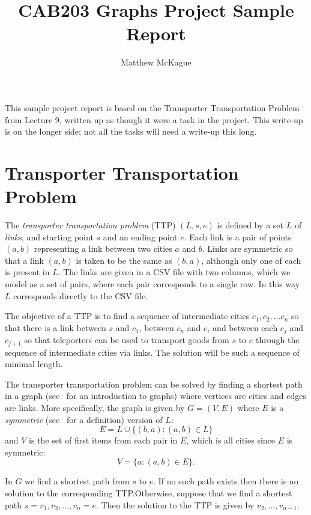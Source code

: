 \documentclass[a4paper]{article}
\author{Matthew McKague}
\title{CAB203 Graphs Project Sample Report}
\date{}
\begin{document}
\maketitle

This sample project report is based on the Transporter Transportation Problem from Lecture 9, written up as though it were a task in the project.  This write-up is on the longer side; not all the tasks will need a write-up this long.

\section{Transporter Transportation Problem}

The \emph{transporter transportation problem} (TTP) $(L, s, e)$ is defined by a set $L$ of \emph{links}, and starting point $s$ and an ending point $e$.  Each link is a pair of points $(a,b)$ representing a link between two cities $a$ and $b$.  Links are symmetric so that a link $(a,b)$ is taken to be the same as $(b, a)$, although only one of each is present in $L$.  The links are given in a CSV file with two columns, which we model as a set of pairs, where each pair corresponds to a single row.  In this way $L$ corresponds directly to the CSV file.

The objective of a TTP is to find a sequence of intermediate cities $c_1, c_2, \ldots c_n$ so that there is a link between $s$ and $c_1$, between $c_n$ and $e$, and between each $c_j$ and $c_{j+1}$ so that teleporters can be used to transport goods from $s$ to $e$ through the sequence of intermediate cities via links.  The solution will be such a sequence of minimal length.

The transporter transportation problem can be solved by finding a shortest path in a graph (see~\cite{voloshintextbook} for an introduction to graphs) where vertices are cities and edges are links.  More specifically, the graph is given by $G = (V, E)$ where $E$ is a \emph{symmetric} (see~\cite{cab203lecture6} for a definition) version of $L$:
\begin{equation}\label{eq:E}
    E = L \cup \{ (b, a) : (a,b) \in L \}
\end{equation}
and $V$ is the set of first items from each pair in $E$, which is all cities since $E$ is symmetric:
\begin{equation}\label{eq:V}
    V = \{ a : (a,b) \in E\}.
\end{equation}

In $G$ we find a shortest path from $s$ to $e$.  If no such path exists then there is no solution to the corresponding TTP.\@  Otherwise, suppose that we find a shortest path $s = v_1, v_2, \ldots , v_n= e$.  Then the solution to the TTP is given by $v_2, \ldots, v_{n-1}$.
\end{document}
